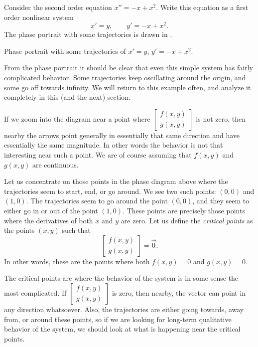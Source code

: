 \begin{example} \label{example:nlin-1b-example}
Consider the second order equation $x''=-x+x^2$.
Write this equation as a first order nonlinear system
\begin{equation*}
x' = y , \qquad y' = -x+x^2 .
\end{equation*}
The phase portrait with some trajectories is drawn in
.
\begin{myfig}
\capstart
{}
\caption{Phase portrait with some trajectories of
$x' = y$, $y' = -x+x^2$. \label{fig:nlin-1b}}
\end{myfig}

From the phase portrait it should be clear that even this simple system has
fairly complicated behavior.  Some trajectories keep oscillating around the
origin, and some go off towards infinity.  We will return to this example
often, and analyze it completely in this (and the next) section.
\end{example}

If we zoom into the diagram near a point where 
$\left[ \begin{smallmatrix} f(x,y) \\ g(x,y) \end{smallmatrix} \right]$ is
not zero, then nearby the arrows point generally in essentially that same
direction and have essentially the same magnitude.
In other words the behavior is not that interesting near such a point.
We are of course assuming that $f(x,y)$ and $g(x,y)$ are continuous.

Let us concentrate on those points in the phase diagram
above where the trajectories
seem to start, end, or go around.  We see two such points:
$(0,0)$ and $(1,0)$.  The trajectories seem to go around the point $(0,0)$,
and they seem to either go in or out of the point $(1,0)$.
%
These points are precisely those points where the derivatives of both $x$
and $y$ are zero.  Let us define the \emph{critical points}
as the points $(x,y)$ such that
\begin{equation*} 
\begin{bmatrix} f(x,y) \\ g(x,y) \end{bmatrix} = \vec{0} .
\end{equation*}
In other words, these are the points where both $f(x,y)=0$ and $g(x,y)=0$.

The critical points are where the behavior of the system is
in some sense the most complicated.  If
$\left[ \begin{smallmatrix} f(x,y) \\ g(x,y) \end{smallmatrix} \right]$
is zero, then nearby, the vector can point in any direction whatsoever.
Also, the trajectories are either going towards, away from, or around these
points, so if we are looking for long-term qualitative behavior of the system, we
should look at what is happening near the critical points.

